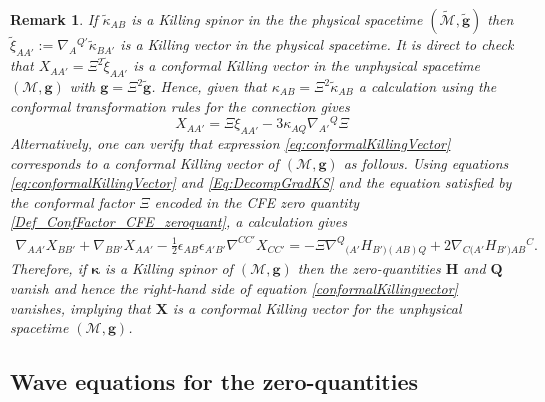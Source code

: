 \documentclass[10pt,a4paper]{article}
\theoremstyle{plain}
\newtheorem{remark}{Remark}
\def\bmg{{\bm g}}
\def\bmH{{\bm H}}
\def\bmQ{{\bm Q}}
\def\bmX{{\bm X}}
\begin{document}
\begin{remark} \emph{
  If $\tilde{\kappa}_{AB}$ is a Killing spinor in the the physical
  spacetime $(\tilde{\mathcal{M}},\tilde{\bmg})$ then
  $\tilde{\xi}_{AA'} := \nabla_A{}^{Q'}\tilde{\kappa}_{BA'}$ is a
  Killing vector in the physical spacetime.  It is direct to check
  that $X_{AA'}=\Xi^2 \tilde{\xi}_{AA'}$ is a conformal Killing vector
  in the unphysical spacetime $(\mathcal{M},\bmg)$ with
  $\bmg=\Xi^2\tilde{\bmg}$.  Hence, given that
  $\kappa_{AB}=\Xi^{2}\tilde{\kappa}_{AB}$ a calculation using the
  conformal transformation rules for the connection gives
\begin{equation}\label{eq:conformalKillingVector}
X_{AA'}=\Xi \xi_{AA'} - 3 \kappa_{AQ}\nabla_{A'}{}^{Q}\Xi
\end{equation}
Alternatively, one can verify that expression \eqref{eq:conformalKillingVector}
corresponds to a conformal Killing vector of $(\mathcal{M},\bmg)$ as follows.
Using equations \eqref{eq:conformalKillingVector} and
\eqref{Eq:DecompGradKS} and the equation satisfied by the conformal
factor $\Xi$ encoded in the CFE zero quantity
\eqref{Def_ConfFactor_CFE_zeroquant}, a calculation gives
\begin{multline}\label{conformalKillingvector}
  \nabla_{AA'}X_{BB'}+\nabla_{BB'}X_{AA'}-\tfrac{1}{2}\epsilon_{AB}\epsilon_{A'B'}\nabla^{CC'}X_{CC'}
  =-\Xi \nabla^Q{}_{(A'}H_{B')(AB)Q} + 2\nabla_{C(A'}H_{B')AB}{}^{C}.
\end{multline}
Therefore, if $\bm\kappa$ is a Killing spinor of $(\mathcal{M},\bmg)$ then
the zero-quantities $\bmH$ and $\bmQ$ vanish and hence the right-hand
side of equation \eqref{conformalKillingvector} vanishes, implying
that $\bmX$ is a conformal Killing vector for the unphysical spacetime $(\mathcal{M},\bmg)$.  }
\end{remark}

\subsection{Wave equations for the zero-quantities}
\end{document}
